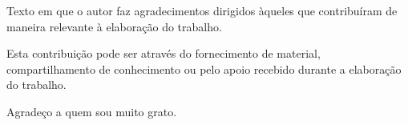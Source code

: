 Texto em que o autor faz agradecimentos dirigidos àqueles que
contribuíram de maneira relevante à elaboração do trabalho.
  
Esta contribuição pode ser através do fornecimento de material,
compartilhamento de conhecimento ou pelo apoio recebido durante a
elaboração do trabalho.

Agradeço a quem sou muito grato.
